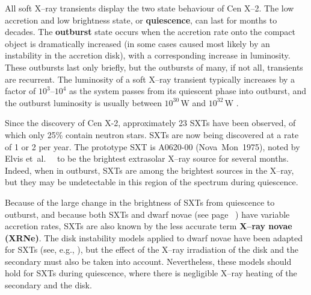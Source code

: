 \vspace{\myparskip}

All soft X--ray transients display the two state behaviour of Cen X--2. The low
accretion and low brightness state, or
\textbf{quiescence}, can last for months to decades. The \textbf{outburst} 
state occurs when the accretion rate onto the
compact object is dramatically increased (in some cases caused most
likely by an instability in the accretion disk), with a corresponding increase in luminosity. 
These outbursts last only briefly, but the outbursts of many, if not all, transients are recurrent. 
 The luminosity of a soft X--ray transient typically increases by a factor
of $10^3$--$10^4$ as the system passes from its quiescent phase into
outburst, and the outburst luminosity is usually between
$10^{30}\,\mathrm{W}$ and $10^{32}\,\mathrm{W}$ %
\cite{TanakaLewin:1995}. %

\vspace{\myparskip}

Since the discovery of Cen X-2, approximately 23 SXTs have been
observed, of which only 25\% contain neutron stars. SXTs are now being
discovered at a rate of 1 or 2 per year. The prototype SXT is A0620-00
(\mbox{Nova Mon 1975}), noted by Elvis et~al.\ %
\citeyear{Elvis_et_al.:1975}%
\ to be the brightest extrasolar X--ray source for several months. %
Indeed, when in outburst, SXTs are among the brightest sources in the X--ray, but they may be undetectable in this region of the spectrum during quiescence. %

\vspace{\myparskip}

Because of the large change in the brightness of SXTs from quiescence
to outburst, and because both SXTs and dwarf novae (see page~%
\pageref{cha:Introduction:sec:X--rayBinaries:subsec:CompactObjects:topic:DwarfNovae}%
) have variable accretion rates, SXTs are also known by the less accurate term \textbf{X--ray novae
(XRNe)}. The disk instability models applied to dwarf novae have been adapted for
SXTs (see, e.g., %
%
), but the effect of the X--ray irradiation of the disk and the secondary must
also be taken into account. Nevertheless, these models should hold for SXTs during quiescence,
where there is negligible X--ray heating of the secondary and the
disk. %

\vspace{\myparskip}


